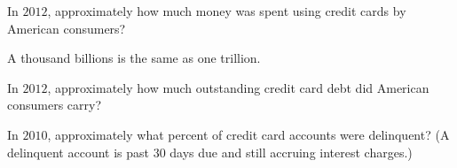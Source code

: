 \documentclass{ximera}
\begin{document}
\begin{question}
In $2012$, approximately how much money was spent using credit cards by American consumers?
    \begin{multipleChoice}
    \end{multipleChoice}
\end{question}

\begin{hint}
A thousand billions is the same as one trillion.
\end{hint}

\begin{question}
In $2012$, approximately how much outstanding credit card debt did American consumers carry?
 
    \begin{multipleChoice}
    \end{multipleChoice}

\end{question}

\begin{question}
In $2010$, approximately what percent of credit card accounts were delinquent? (A delinquent account is past $30$ days due and still accruing interest charges.)

    \begin{multipleChoice}
    \end{multipleChoice}

\end{question}
\end{document}
